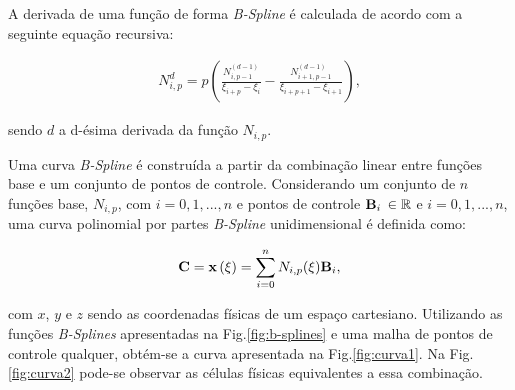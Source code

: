 \documentclass[tese_patricia]{subfiles}
\begin{document}
A derivada de uma função de forma \textit{B-Spline} é calculada de acordo com a seguinte equação recursiva:

\begin{align}
N_{i,p}^d = p\left(\frac{N_{i,p-1}^{(d-1)}}{\xi_{i+p} - \xi_{i}} - \frac{N_{i+1,p-1}^{(d-1)}}{\xi_{i+p+1} - \xi_{i+1}}\right),
\end{align}

\noindent sendo $d$ a d-ésima derivada da função $N_{i,p}$.

Uma curva \textit{B-Spline} é construída a partir da combinação linear entre funções base e um conjunto de pontos de controle. Considerando um conjunto de $n$ funções base, $N_{i,p}$, com $i = 0,1,...,n$ e pontos de controle $\mathbf{B}_i$ $\in \mathbb{R}$ e $i = 0,1,...,n$, uma curva polinomial por partes \textit{B-Spline} unidimensional é definida como:

\begin{align}
\mathbf{C} =\mathbf{x}\left(\xi\right) = \sum_{i=0}^{n}N_{i,p}(\xi)\mathbf{B}_i,
\end{align}

\noindent com $x$, $y$ e $z$ sendo as coordenadas físicas de um espaço cartesiano. Utilizando as funções \textit{B-Splines} apresentadas na Fig.\ref{fig:b-splines} e uma malha de pontos de controle qualquer, obtém-se a curva apresentada na Fig.\ref{fig:curva1}. Na Fig.\ref{fig:curva2} pode-se observar as células físicas equivalentes a essa combinação.
\end{document}
